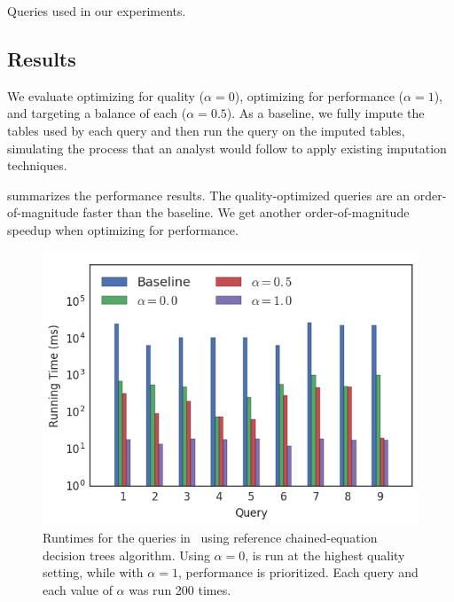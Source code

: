 \begin{table}
  \centering
  
  \vspace{1ex}
  \caption{Queries used in our experiments.}\label{tbl:queries}
\end{table}

%  

\subsection{Results}\label{sec:results}

We evaluate \ProjectName{} optimizing for quality ($\alpha=0$), optimizing for performance
($\alpha=1$), and targeting a balance of each ($\alpha = 0.5$). As a baseline, we fully impute the tables
used by each query and then run the query on the imputed tables, simulating the process that
an analyst would follow to apply existing imputation techniques.

 summarizes the performance results. The quality-optimized
queries are an order-of-magnitude faster than the baseline. We get another order-of-magnitude speedup when optimizing for performance.

\begin{figure}
\includegraphics[width=\columnwidth]{figures/running_times_combined_bar.png}
\caption{Runtimes for the queries in~ using reference
    chained-equation decision trees algorithm. Using $\alpha=0$, \ProjectName{}
    is run at the highest quality setting, while with $\alpha=1$, performance
    is prioritized. Each query and each value of $\alpha$ was run 200 times.}
\label{fig:runtimes}
\end{figure}

